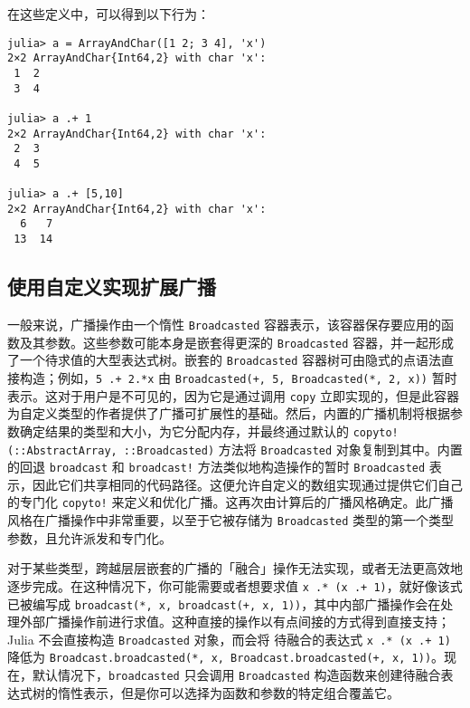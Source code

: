 在这些定义中，可以得到以下行为：




\begin{verbatim}
julia> a = ArrayAndChar([1 2; 3 4], 'x')
2×2 ArrayAndChar{Int64,2} with char 'x':
 1  2
 3  4

julia> a .+ 1
2×2 ArrayAndChar{Int64,2} with char 'x':
 2  3
 4  5

julia> a .+ [5,10]
2×2 ArrayAndChar{Int64,2} with char 'x':
  6   7
 13  14
\end{verbatim}



\hypertarget{5201970122303370123}{}


\subsection{使用自定义实现扩展广播}



一般来说，广播操作由一个惰性 \texttt{Broadcasted} 容器表示，该容器保存要应用的函数及其参数。这些参数可能本身是嵌套得更深的 \texttt{Broadcasted} 容器，并一起形成了一个待求值的大型表达式树。嵌套的 \texttt{Broadcasted} 容器树可由隐式的点语法直接构造；例如，\texttt{5 .+ 2.*x} 由 \texttt{Broadcasted(+, 5, Broadcasted(*, 2, x))} 暂时表示。这对于用户是不可见的，因为它是通过调用 \texttt{copy} 立即实现的，但是此容器为自定义类型的作者提供了广播可扩展性的基础。然后，内置的广播机制将根据参数确定结果的类型和大小，为它分配内存，并最终通过默认的 \texttt{copyto!(::AbstractArray, ::Broadcasted)} 方法将 \texttt{Broadcasted} 对象复制到其中。内置的回退 \texttt{broadcast} 和 \texttt{broadcast!} 方法类似地构造操作的暂时 \texttt{Broadcasted} 表示，因此它们共享相同的代码路径。这便允许自定义的数组实现通过提供它们自己的专门化 \texttt{copyto!} 来定义和优化广播。这再次由计算后的广播风格确定。此广播风格在广播操作中非常重要，以至于它被存储为 \texttt{Broadcasted} 类型的第一个类型参数，且允许派发和专门化。



对于某些类型，跨越层层嵌套的广播的「融合」操作无法实现，或者无法更高效地逐步完成。在这种情况下，你可能需要或者想要求值 \texttt{x .* (x .+ 1)}，就好像该式已被编写成 \texttt{broadcast(*, x, broadcast(+, x, 1))}，其中内部广播操作会在处理外部广播操作前进行求值。这种直接的操作以有点间接的方式得到直接支持；Julia 不会直接构造 \texttt{Broadcasted} 对象，而会将 待融合的表达式 \texttt{x .* (x .+ 1)} 降低为 \texttt{Broadcast.broadcasted(*, x, Broadcast.broadcasted(+, x, 1))}。现在，默认情况下，\texttt{broadcasted} 只会调用 \texttt{Broadcasted} 构造函数来创建待融合表达式树的惰性表示，但是你可以选择为函数和参数的特定组合覆盖它。



